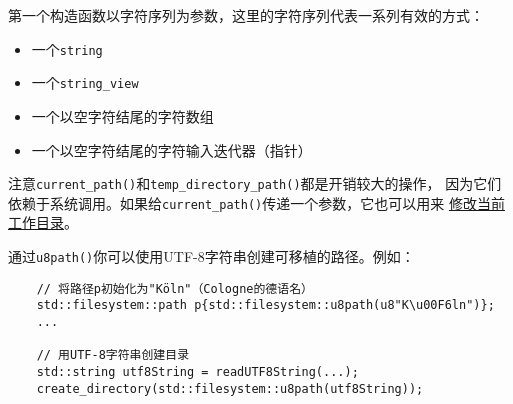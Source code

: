 第一个构造函数以字符序列为参数，这里的字符序列代表一系列有效的方式：
\begin{itemize}
    \item 一个\texttt{string}
    \item 一个\texttt{string\_view}
    \item 一个以空字符结尾的字符数组
    \item 一个以空字符结尾的字符输入迭代器（指针）
\end{itemize}
注意\texttt{current\_path()}和\texttt{temp\_directory\_path()}都是开销较大的操作，
因为它们依赖于系统调用。如果给\texttt{current\_path()}传递一个参数，它也可以用来
\hyperref[ch20.4.6]{修改当前工作目录}。

通过\texttt{u8path()}你可以使用UTF-8字符串创建可移植的路径。例如：
\begin{lstlisting}
    // 将路径p初始化为"Köln"（Cologne的德语名）
    std::filesystem::path p{std::filesystem::u8path(u8"K\u00F6ln")};
    ...

    // 用UTF-8字符串创建目录
    std::string utf8String = readUTF8String(...);
    create_directory(std::filesystem::u8path(utf8String));
\end{lstlisting}

